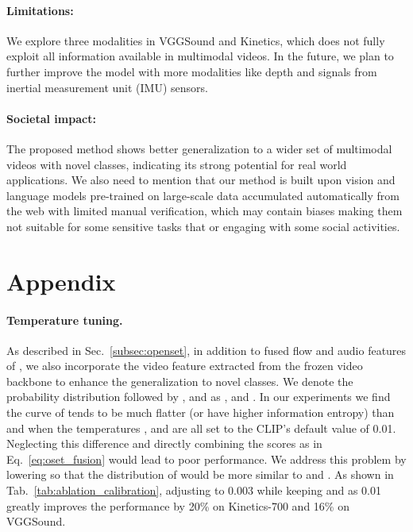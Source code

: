 \documentclass{article}
\begin{document}
\paragraph{Limitations:} We explore three modalities in VGGSound and Kinetics, which does not fully exploit all information available in multimodal videos. In the future, we plan to further improve the model with more modalities like depth and signals from inertial measurement unit (IMU) sensors.

\paragraph{Societal impact:} The proposed method shows better generalization to a wider set of multimodal videos with novel classes, indicating its strong potential for real world applications. We also need to mention that our method is built upon vision and language models pre-trained on large-scale data accumulated automatically from the web with limited manual verification, which may contain biases making them not suitable for some sensitive tasks that or engaging with some social activities.


\clearpage




\clearpage
\appendix
\section{Appendix}
\label{appx:temperature_tuning}

\paragraph{Temperature tuning.} As described in Sec.~\ref{subsec:openset}, in addition to fused flow and audio features of , we also incorporate the video feature
 extracted from the frozen video backbone to enhance the generalization to novel classes. We denote the probability distribution followed by ,  and  as ,  and . 
In our experiments we find the curve of  tends to be much flatter (or have higher information entropy) than  and  when the temperatures ,  and  are all set to the CLIP's default value of 0.01. Neglecting this difference and directly combining the scores as in Eq.~\ref{eq:oset_fusion} would lead to poor performance.
We address this problem by lowering  so that the distribution of  would be more similar to  and . As shown in Tab.~\ref{tab:ablation_calibration}, adjusting  to 0.003 while keeping  and  as 0.01 greatly improves the performance by 20\% on Kinetics-700 and 16\% on VGGSound.
\end{document}
